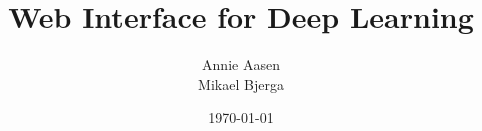 \newcommand{\mytitle}{Web Interface for Deep Learning}
\newcommand{\myauthor}{Annie Aasen\\Mikael Bjerga\\}
\newcommand{\mysupervisor}{Supervisor: Theoharis Theoharis}

\title{\mytitle}
\author{\myauthor}
\date{\today}